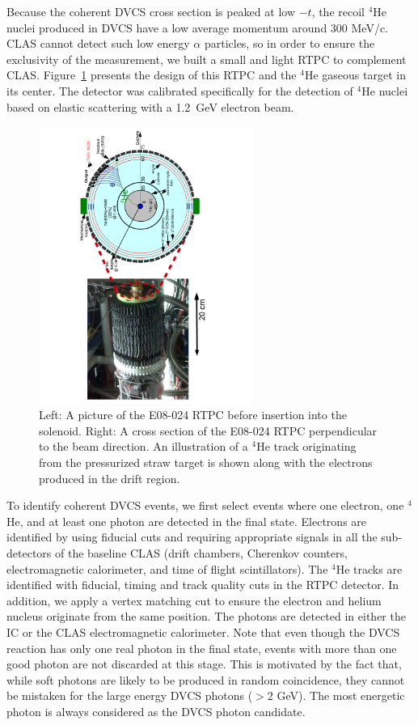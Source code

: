 \documentclass[preprint,nofootinbib,showpacs,prl,superscriptaddress,secnumarabic,amssymb,nobibnotes,aps,floatfix]{revtex4}
\begin{document}
Because the coherent DVCS cross section is peaked at low $-t$, the recoil 
$^4$He nuclei produced in DVCS have a low average momentum around 300 
MeV/c. CLAS cannot detect such low energy $\alpha$ particles, 
so in order to ensure the exclusivity of the measurement, we built a small and 
light RTPC to complement CLAS. Figure~\ref{fig:RTPC} presents the design of 
this RTPC and the $^4$He gaseous target in its center. The detector was 
calibrated specifically for the detection of
$^4$He nuclei based on elastic scattering with a 1.2~GeV electron beam.


\begin{figure}[tb]
\vspace{-1.1cm}
\includegraphics[width=7.0cm,angle=-90]{figs/RTPC.pdf}
\vspace{-1.1cm}
\caption{Left: A picture of the E08-024 RTPC before insertion into the 
   solenoid. Right: A cross section of the E08-024 RTPC perpendicular to the 
   beam direction. An illustration of a $^4$He track originating from the 
   pressurized straw target is shown along with the electrons produced in the 
   drift region.}
\label{fig:RTPC}
\end{figure}

To identify coherent DVCS events, we first select events where one 
electron, one $^4$He, and at least one photon are detected in the final state. 
Electrons are identified by using fiducial cuts and requiring appropriate
signals in all the sub-detectors of the baseline CLAS (drift chambers, 
Cherenkov counters, electromagnetic calorimeter, and time of flight 
scintillators). The $^4$He tracks are identified with fiducial, 
timing and track quality cuts in the RTPC detector. In addition,
we apply a vertex matching cut to ensure the electron and helium
nucleus originate from the same position. The photons are detected in either
the IC or the CLAS electromagnetic calorimeter.  Note that even though the 
DVCS reaction has only one real photon in the final state, 
events with more than one good photon are not discarded at this stage. This is 
motivated by the fact that, while soft photons are likely to be produced in random 
coincidence, they cannot be mistaken for the large energy DVCS photons ($>2$ GeV).
The most energetic photon is always considered as the DVCS photon candidate.
\end{document}
